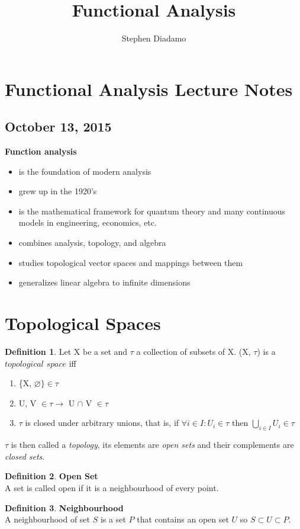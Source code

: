 \documentclass[10pt,a4paper]{article}
\author{Stephen Diadamo}
\title{Functional Analysis}
\theoremstyle{definition}
\newtheorem{definition}{Definition}
\theoremstyle{cor}
\theoremstyle{theorem}
\theoremstyle{lemma}
\theoremstyle{example}
\theoremstyle{remark}
\begin{document}
\section{Functional Analysis Lecture Notes}
\subsection*{October 13, 2015}
\textbf{Function analysis }
\begin{itemize}
	\item is the foundation of modern analysis
	\item grew up in the 1920's
	\item is the mathematical framework for quantum theory and many continuous models in engineering, economics, etc.
	\item combines analysis, topology, and algebra
	\item studies topological vector spaces and mappings between them
	\item generalizes linear algebra to infinite dimensions 
\end{itemize}
\section{Topological Spaces}

\begin{definition}
Let X be a set and $\tau$ a collection of subsets of X. (X, $\tau$) is a $\textit{topological space}$ iff
\begin{enumerate}
\item \{X, $\varnothing \} \in \tau$
\item {U, V} $\in\tau \rightarrow$ U $\cap $ V $\in\tau$
\item $\tau$ is closed under arbitrary unions, that is, if $\forall i\in I : U_i \in\tau$ then $\bigcup_{i \in I} U_i \in \tau$  
\end{enumerate}
\end{definition}
$\tau$ is then called a \textit{topology}, its elements are \textit{open sets} and their complements are \textit{closed sets}.

\begin{definition}
\textbf{Open Set} \\
A set is called open if it is a neighbourhood of every point. 
\end{definition}
\begin{definition}
\textbf{Neighbourhood} \\
A neighbourhood of set $S$ is a set $P$ that contains an open set $U$ so $S \subset U \subset P$. 
\end{definition}
\end{document}

